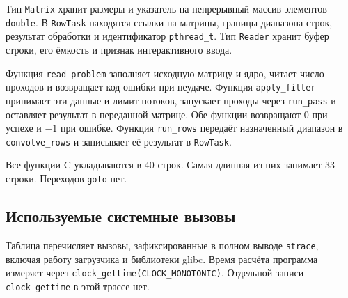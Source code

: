 \documentclass[12pt,a4paper]{article}
\begin{document}
Тип \texttt{Matrix} хранит размеры и указатель на непрерывный массив элементов \texttt{double}. В \texttt{RowTask} находятся ссылки на матрицы, границы диапазона строк, результат обработки и идентификатор \texttt{pthread\_t}. Тип \texttt{Reader} хранит буфер строки, его ёмкость и признак интерактивного ввода.

Функция \texttt{read\_problem} заполняет исходную матрицу и ядро, читает число проходов и возвращает код ошибки при неудаче. Функция \texttt{apply\_filter} принимает эти данные и лимит потоков, запускает проходы через \texttt{run\_pass} и оставляет результат в переданной матрице. Обе функции возвращают 0 при успехе и $-1$ при ошибке. Функция \texttt{run\_rows} передаёт назначенный диапазон в \texttt{convolve\_rows} и записывает её результат в \texttt{RowTask}.

Все функции C укладываются в 40 строк. Самая длинная из них занимает 33 строки. Переходов \texttt{goto} нет.

\subsection{Используемые системные вызовы}

Таблица перечисляет вызовы, зафиксированные в полном выводе \texttt{strace}, включая работу загрузчика и библиотеки glibc. Время расчёта программа измеряет через \texttt{clock\_gettime(CLOCK\_MONOTONIC)}. Отдельной записи \texttt{clock\_gettime} в этой трассе нет.
\end{document}
